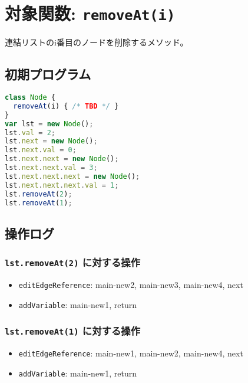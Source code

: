 \documentclass{article}
\begin{document}










\section{対象関数: \texttt{removeAt(i)}}
連結リストのi番目のノードを削除するメソッド。

\subsection{初期プログラム}

\begin{lstlisting}[language=JavaScript]
class Node {
  removeAt(i) { /* TBD */ }
}
var lst = new Node(); 
lst.val = 2;
lst.next = new Node();
lst.next.val = 0;
lst.next.next = new Node(); 
lst.next.next.val = 3;
lst.next.next.next = new Node(); 
lst.next.next.next.val = 1;
lst.removeAt(2);
lst.removeAt(1);
\end{lstlisting}

\subsection{操作ログ}

\subsubsection{\texttt{lst.removeAt(2)} に対する操作}
\begin{itemize}
  \item \texttt{editEdgeReference}: main-new2, main-new3, main-new4, next
  \item \texttt{addVariable}: main-new1, return
\end{itemize}

\subsubsection{\texttt{lst.removeAt(1)} に対する操作}
\begin{itemize}
  \item \texttt{editEdgeReference}: main-new1, main-new2, main-new4, next
  \item \texttt{addVariable}: main-new1, return
\end{itemize}
\end{document}
